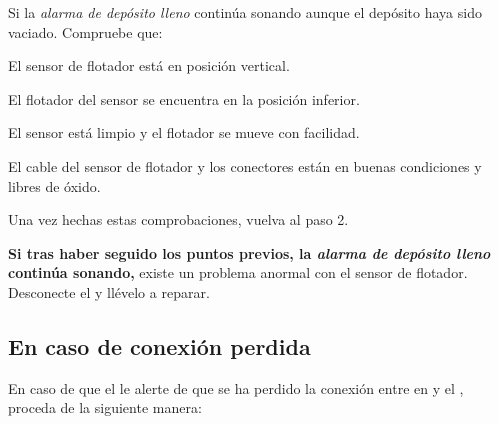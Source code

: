 \begin{enumeratecompact}
\begin{itemizecompact}
\item Si la \emph{alarma de depósito lleno} continúa sonando aunque el depósito haya sido vaciado. Compruebe que:

\begin{itemizecompact}

\item El sensor de flotador está en posición vertical.

\item El flotador del sensor se encuentra en la posición inferior.

\item El sensor está limpio y el flotador se mueve con facilidad.

\item El cable del sensor de flotador y los conectores están en buenas condiciones y libres de óxido.

\end{itemizecompact}

Una vez hechas estas comprobaciones, vuelva al paso 2.

\end{itemizecompact}

\item \textbf{\color{main}Si tras haber seguido los puntos previos, la \emph{alarma de depósito lleno} continúa sonando,} existe un problema anormal con el sensor de flotador. Desconecte el \CMS y llévelo a reparar.

\end{enumeratecompact}

\subsection{En caso de conexión perdida}
\label{sec:conn-perdida}
En caso de que el \CMS le alerte de que se ha perdido la conexión entre en \MIE y el \MEE, proceda de la siguiente manera:

